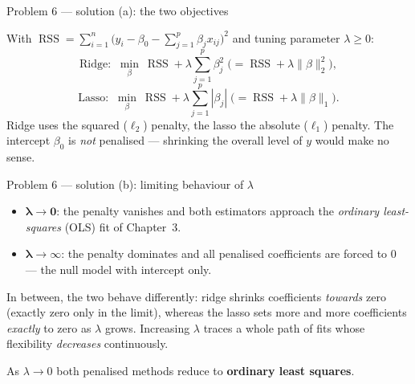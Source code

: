 \documentclass[aspectratio=169,11pt]{beamer}
\begin{document}
\begin{frame}{Problem 6 --- solution (a): the two objectives}
  \begin{solutionbox}
    With
    $\operatorname{RSS}=\sum_{i=1}^{n}\bigl(y_i-\beta_0-\sum_{j=1}^{p}\beta_j x_{ij}\bigr)^2$
    and tuning parameter $\lambda\ge 0$:
    \[
      \text{Ridge: }\ \min_{\beta}\ \operatorname{RSS}+\lambda\sum_{j=1}^{p}\beta_j^{2}
        \;\bigl(=\operatorname{RSS}+\lambda\|\beta\|_2^2\bigr),
    \]
    \[
      \text{Lasso: }\ \min_{\beta}\ \operatorname{RSS}+\lambda\sum_{j=1}^{p}|\beta_j|
        \;\bigl(=\operatorname{RSS}+\lambda\|\beta\|_1\bigr).
    \]
    Ridge uses the squared ($\ell_2$) penalty, the lasso the absolute ($\ell_1$) penalty.
    The intercept $\beta_0$ is \emph{not} penalised --- shrinking the overall level of $y$
    would make no sense.
  \end{solutionbox}
\end{frame}

\begin{frame}{Problem 6 --- solution (b): limiting behaviour of $\lambda$}
  \begin{solutionbox}
    \begin{itemize}
      \item $\boldsymbol{\lambda\to 0}$: the penalty vanishes and both estimators approach
        the \emph{ordinary least-squares} (OLS) fit of Chapter~3.
      \item $\boldsymbol{\lambda\to\infty}$: the penalty dominates and all penalised
        coefficients are forced to $0$ --- the null model with intercept only.
    \end{itemize}
    In between, the two behave differently: ridge shrinks coefficients \emph{towards} zero
    (exactly zero only in the limit), whereas the lasso sets more and more coefficients
    \emph{exactly} to zero as $\lambda$ grows. Increasing $\lambda$ traces a whole path of
    fits whose flexibility \emph{decreases} continuously.
  \end{solutionbox}
  \begin{takeaway}
    As $\lambda\to0$ both penalised methods reduce to \textbf{ordinary least squares}.
  \end{takeaway}
\end{frame}
\end{document}
